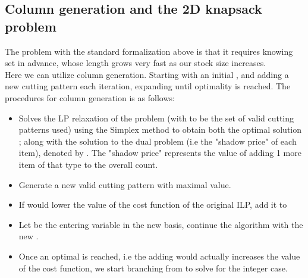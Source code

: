 \documentclass[a4paper]{article}
\begin{document}
    \subsection{Column generation and the 2D knapsack problem}

    The problem with the standard formalization above is that it requires knowing set 
    in advance, whose length grows very fast as our stock size increases. 
    \vspace{0.2cm}\\
    Here we can utilize column generation. Starting with an initial ,
    and adding a new cutting pattern  each iteration, expanding  until optimality is reached. The procedures for column generation is as follows:

    \begin{itemize}
        \item Solves the LP relaxation of the problem (with  to be the set of valid cutting patterns used) using the Simplex method to obtain both the optimal solution ; along with the solution to the dual problem (i.e the "shadow price" of each item), denoted by . The "shadow price" represents the value of adding 1 more item of that type to the overall count. 
        \item Generate a new valid cutting pattern  with maximal value.
        \item If  would lower the value of the cost function of the original ILP, add it to 
        \item Let  be the entering variable in the new basis, continue the algorithm with the new .
        \item Once an optimal  is reached, i.e the adding  would actually increases the value of the cost function, we start branching from  to solve for the integer case.
    \end{itemize}
\end{document}
